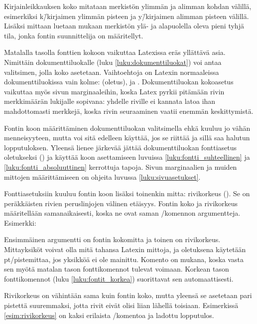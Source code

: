 Kirjainleikkauksen koko mitataan merkistön ylimmän ja alimman kohdan
välillä, esimerkiksi k\=/kirjaimen ylimmän pisteen ja y\=/kirjaimen
alimman pisteen välillä. Lisäksi mittaan luetaan mukaan merkistön ylä-
ja alapuolella oleva pieni tyhjä tila, jonka fontin suunnittelija on
määritellyt.

Matalalla tasolla fonttien kokoon vaikuttaa Latexissa eräs yllättävä
asia. Nimittäin dokumenttiluokalle (luku \ref{luku:dokumenttiluokat})
voi antaa valitsimen, jolla koko asetetaan. Vaihtoehtoja on Latexin
normaaleissa dokumenttiluokissa vain kolme: \koodi{10pt} (oletus),
\koodi{11pt} ja \koodi{12pt}. Dokumenttiluokan koko\-asetus vaikuttaa
myös sivun marginaaleihin, koska Latex pyrkii pitämään rivin
merkkimäärän lukijalle sopivana: yhdelle riville ei kannata latoa ihan
mahdottomasti merkkejä, koska rivin seuraaminen vaatii enemmän
keskittymistä.

Fontin koon määrittäminen dokumenttiluokan valitsimella ehkä kuuluu jo
vähän menneisyyteen, mutta voi sitä edelleen käyttää, jos se riittää ja
sillä saa halutun lopputuloksen. Yleensä lienee järkevää jättää
dokumenttiluokan fonttiasetus oletukseksi (\koodi{10pt}) ja käyttää koon
asettamiseen luvuissa \ref{luku:fontti_suhteellinen} ja
\ref{luku:fontti_absoluuttinen} kerrottuja tapoja. Sivun marginaalien ja
muiden mittojen määrittämiseen on ohjeita luvussa
\ref{luku:sivuasetukset}.

Fonttiasetuksiin kuuluu fontin koon lisäksi toinenkin mitta: rivikorkeus
(). Se on peräkkäisten rivien
peruslinjojen välinen etäisyys. Fontin koko ja rivikorkeus määritellään
saman\-aikaisesti, koska ne ovat saman \-/komennon
argumentteja. Esimerkki:

\begin{koodilohkosis}
  \fontsize{10bp}{12bp} \selectfont
\end{koodilohkosis}

Ensimmäinen argumentti on fontin kokomitta ja toinen on rivikorkeus.
Mitta\-yksiköt voivat olla mitä tahansa Latexin mittoja, ja oletuksena
käytetään pt\-/pistemittaa, jos yksikköä ei ole mainittu. Komento
 on mukana, koska vasta sen myötä matalan
tason fonttikomennot tulevat voimaan. Korkean tason fonttikomennot (luku
\ref{luku:fontit_korkea}) suorittavat sen automaattisesti.

Rivikorkeus on vähintään sama kuin fontin koko, mutta yleensä se
asetetaan pari pistettä suuremmaksi, jotta rivit eivät olisi liian
lähellä toisiaan. Esimerkissä \ref{esim:rivikorkeus} on kaksi erilaista
\-/komentoa ja ladottu lopputulos.

